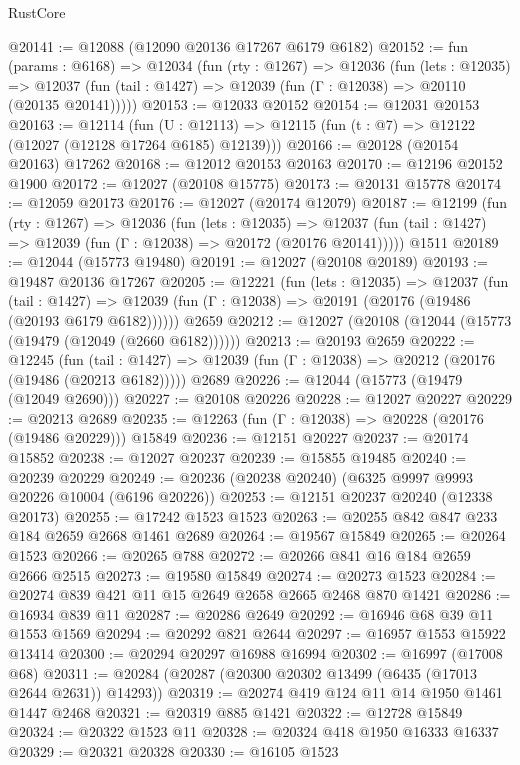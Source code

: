 \begin{lexlean}{RustCore}
\begin{coremodule}
@20141 := @12088 (@12090 @20136 @17267 @6179 @6182)
@20152 := fun (params : @6168) =>
  @12034
    (fun (rty : @1267) =>
    @12036
      (fun (lets : @12035) =>
      @12037 (fun (tail : @1427) => @12039 (fun (Γ : @12038) => @20110 (@20135 @20141)))))
@20153 := @12033 @20152
@20154 := @12031 @20153
@20163 := @12114
    (fun (U : @12113) => @12115 (fun (t : @7) => @12122 (@12027 (@12128 @17264 @6185) @12139)))
@20166 := @20128 (@20154 @20163) @17262
@20168 := @12012 @20153 @20163
@20170 := @12196 @20152 @1900
@20172 := @12027 (@20108 @15775)
@20173 := @20131 @15778
@20174 := @12059 @20173
@20176 := @12027 (@20174 @12079)
@20187 := @12199
    (fun (rty : @1267) =>
    @12036
      (fun (lets : @12035) =>
      @12037 (fun (tail : @1427) => @12039 (fun (Γ : @12038) => @20172 (@20176 @20141)))))
    @1511
@20189 := @12044 (@15773 @19480)
@20191 := @12027 (@20108 @20189)
@20193 := @19487 @20136 @17267
@20205 := @12221
    (fun (lets : @12035) =>
    @12037
      (fun (tail : @1427) =>
      @12039 (fun (Γ : @12038) => @20191 (@20176 (@19486 (@20193 @6179 @6182))))))
    @2659
@20212 := @12027 (@20108 (@12044 (@15773 (@19479 (@12049 (@2660 @6182))))))
@20213 := @20193 @2659
@20222 := @12245
    (fun (tail : @1427) => @12039 (fun (Γ : @12038) => @20212 (@20176 (@19486 (@20213 @6182)))))
    @2689
@20226 := @12044 (@15773 (@19479 (@12049 @2690)))
@20227 := @20108 @20226
@20228 := @12027 @20227
@20229 := @20213 @2689
@20235 := @12263 (fun (Γ : @12038) => @20228 (@20176 (@19486 @20229))) @15849
@20236 := @12151 @20227
@20237 := @20174 @15852
@20238 := @12027 @20237
@20239 := @15855 @19485
@20240 := @20239 @20229
@20249 := @20236 (@20238 @20240) (@6325 @9997 @9993 @20226 @10004 (@6196 @20226))
@20253 := @12151 @20237 @20240 (@12338 @20173)
@20255 := @17242 @1523 @1523
@20263 := @20255 @842 @847 @233 @184 @2659 @2668 @1461 @2689
@20264 := @19567 @15849
@20265 := @20264 @1523
@20266 := @20265 @788
@20272 := @20266 @841 @16 @184 @2659 @2666 @2515
@20273 := @19580 @15849
@20274 := @20273 @1523
@20284 := @20274 @839 @421 @11 @15 @2649 @2658 @2665 @2468 @870 @1421
@20286 := @16934 @839 @11
@20287 := @20286 @2649
@20292 := @16946 @68 @39 @11 @1553 @1569
@20294 := @20292 @821 @2644
@20297 := @16957 @1553 @15922 @13414
@20300 := @20294 @20297 @16988 @16994
@20302 := @16997 (@17008 @68)
@20311 := @20284 (@20287 (@20300 @20302 @13499 (@6435 (@17013 @2644 @2631)) @14293))
@20319 := @20274 @419 @124 @11 @14 @1950 @1461 @1447 @2468
@20321 := @20319 @885 @1421
@20322 := @12728 @15849
@20324 := @20322 @1523 @11
@20328 := @20324 @418 @1950 @16333 @16337
@20329 := @20321 @20328
@20330 := @16105 @1523

\end{coremodule}
\end{lexlean}
